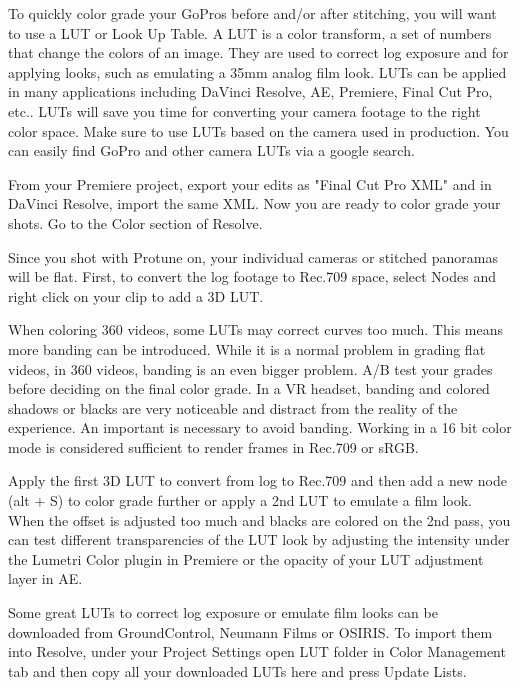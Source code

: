 \begin{fullwidth}

To quickly color grade your GoPros before and/or after stitching, you will want to use a LUT or Look Up Table. A LUT is a color transform, a set of numbers that change the colors of an image. They are used to correct log exposure and for applying looks, such as emulating a 35mm analog film look. LUTs can be applied in many applications including DaVinci Resolve, AE, Premiere, Final Cut Pro, etc.. LUTs will save you time for converting your camera footage to the right color space. Make sure to use LUTs based on the camera used in production. You can easily find GoPro and other camera LUTs via a google search.

From your Premiere project, export your edits as "Final Cut Pro XML" and in DaVinci Resolve, import the same XML. Now you are ready to color grade your shots. Go to the Color section of Resolve.


Since you shot with Protune on, your individual cameras or stitched panoramas will be flat. First, to convert the log footage to Rec.709 space, select Nodes and right click on your clip to add a 3D LUT. 


When coloring 360 videos, some LUTs may correct curves too much. This means more banding can be introduced. While it is a normal problem in grading flat videos, in 360 videos, banding is an even bigger problem. A/B test your grades before deciding on the final color grade. In a VR headset, banding and colored shadows or blacks are very noticeable and distract from the reality of the experience. An important \textbf{} is necessary to avoid banding. Working in a 16 bit color mode is considered sufficient to render frames in Rec.709 or sRGB.


Apply the first 3D LUT to convert from log to Rec.709 and then add a new node (alt + S) to color grade further or apply a 2nd LUT to emulate a film look. When the offset is adjusted too much and blacks are colored on the 2nd pass, you can test different transparencies of the LUT look by adjusting the intensity under the Lumetri Color plugin in Premiere or the opacity of your LUT adjustment layer in AE.


\tip Some great LUTs to correct log exposure or emulate film looks can be downloaded from GroundControl, Neumann Films or OSIRIS. To import them into Resolve, under your Project Settings open LUT folder in Color Management tab and then copy all your downloaded LUTs here and press Update Lists.  


\end{fullwidth}
